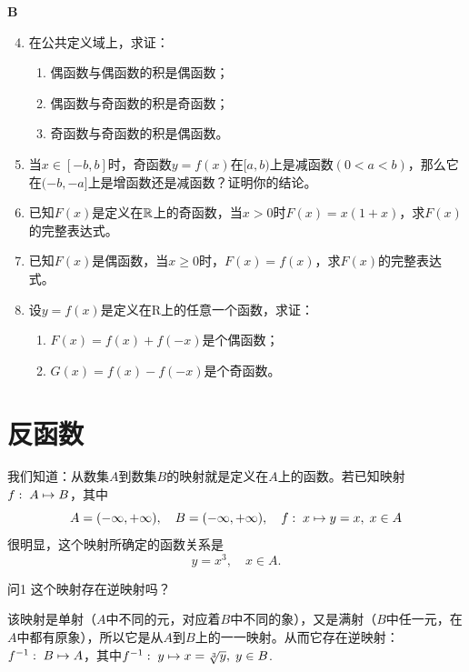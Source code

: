 \begin{center}
    \bfseries B
\end{center}

\begin{enumerate}\setcounter{enumi}{3}
    \item 在公共定义域上，求证：
\begin{enumerate}[(1)]
    \item 偶函数与偶函数的积是偶函数；
    \item 偶函数与奇函数的积是奇函数；
    \item 奇函数与奇函数的积是偶函数。
\end{enumerate}
\item     当$x\in [-b,b]$时，奇函数$y=f(x)$在$[a,b)$上是减函数$(0<a<b)$，那么它在$(-b,-a]$上是增函数还是减函数？证明你的结论。
\item     已知$F(x)$是定义在$\mathbb{R}$上的奇函数，当$x>0$时$F(x)=x(1+x)$，求$F(x)$的完整表达式。
\item    已知$F(x)$是偶函数，当$x\ge 0$时，$F(x)=f(x)$，求$F(x)$的完整表达式。
\item    设$y=f(x)$是定义在R上的任意一个函数，求证：
\begin{enumerate}[(1)]
    \item $F(x)=f(x)+f(-x)$是个偶函数；
    \item $G(x)=f(x)-f(-x)$是个奇函数。
\end{enumerate}
    
\end{enumerate}

\section{反函数}

我们知道：从数集$A$到数集$B$的映射就是定义在$A$上的函数。若已知映射$f:\; A\mapsto B$，其中
\[A=(-\infty,+\infty),\quad B=(-\infty,+\infty),\quad f:\; x\mapsto y=x,\; x\in A\]
很明显，这个映射所确定的函数关系是
\begin{equation}
    y=x^3,\quad x\in A.\tag{1}
\end{equation} 

\begin{thm}{问1}
    这个映射存在逆映射吗？
\end{thm}

\begin{analyze}
    该映射是单射（$A$中不同的元，对应着$B$中不同的象），又是满射（$B$中任一元，在$A$中都有原象），所以它是从$A$到$B$上的一一映射。从而它存在逆映射：
$f^{-1}:\; B\mapsto A$，其中$f^{-1}:\; y\mapsto x=\sqrt[3]{y},\; y\in B$.
\end{analyze}

